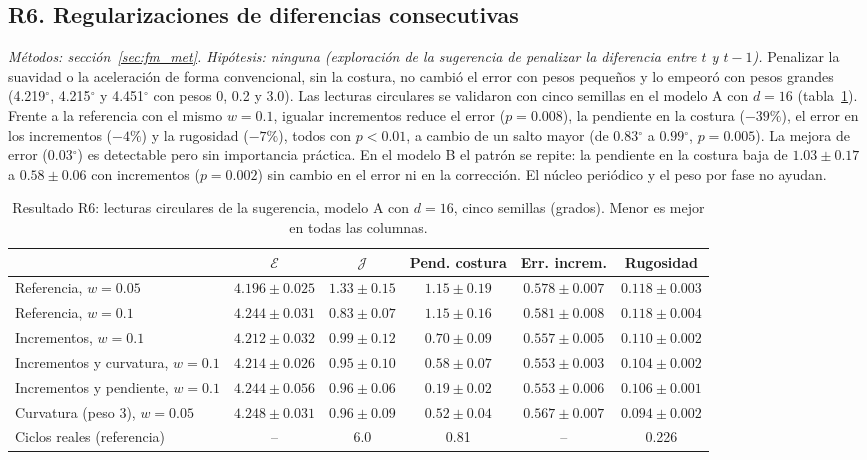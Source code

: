 \documentclass[11pt,a4paper]{article}
\newcommand{\gr}{$^{\circ}$}
\begin{document}
\subsection{R6. Regularizaciones de diferencias consecutivas}
\label{sec:r6}

\textit{Métodos: sección~\ref{sec:fm_met}. Hipótesis: ninguna (exploración de la sugerencia de penalizar la diferencia entre $t$ y $t-1$).} Penalizar la suavidad o la aceleración de forma convencional, sin la costura, no cambió el error con pesos pequeños y lo empeoró con pesos grandes (4.219\gr{}, 4.215\gr{} y 4.451\gr{} con pesos 0, 0.2 y 3.0). Las lecturas circulares se validaron con cinco semillas en el modelo A con $d=16$ (tabla~\ref{tab:lecturas}). Frente a la referencia con el mismo $w=0.1$, igualar incrementos reduce el error ($p=0.008$), la pendiente en la costura ($-39\%$), el error en los incrementos ($-4\%$) y la rugosidad ($-7\%$), todos con $p<0.01$, a cambio de un salto mayor (de $0.83$\gr{} a $0.99$\gr{}, $p=0.005$). La mejora de error ($0.03$\gr) es detectable pero sin importancia práctica. En el modelo B el patrón se repite: la pendiente en la costura baja de $1.03\pm0.17$ a $0.58\pm0.06$ con incrementos ($p=0.002$) sin cambio en el error ni en la corrección. El núcleo periódico y el peso por fase no ayudan.

\begin{table}[h]
\centering\footnotesize
\setlength{\tabcolsep}{3pt}
\begin{tabular}{lccccc}
\toprule
 & $\mathcal E$ & $\mathcal J$ & Pend. costura & Err. increm. & Rugosidad \\
\midrule
Referencia, $w=0.05$ & $4.196\pm0.025$ & $1.33\pm0.15$ & $1.15\pm0.19$ & $0.578\pm0.007$ & $0.118\pm0.003$ \\
Referencia, $w=0.1$ & $4.244\pm0.031$ & $0.83\pm0.07$ & $1.15\pm0.16$ & $0.581\pm0.008$ & $0.118\pm0.004$ \\
Incrementos, $w=0.1$ & $4.212\pm0.032$ & $0.99\pm0.12$ & $0.70\pm0.09$ & $0.557\pm0.005$ & $0.110\pm0.002$ \\
Incrementos y curvatura, $w=0.1$ & $4.214\pm0.026$ & $0.95\pm0.10$ & $0.58\pm0.07$ & $0.553\pm0.003$ & $0.104\pm0.002$ \\
Incrementos y pendiente, $w=0.1$ & $4.244\pm0.056$ & $0.96\pm0.06$ & $0.19\pm0.02$ & $0.553\pm0.006$ & $0.106\pm0.001$ \\
Curvatura (peso 3), $w=0.05$ & $4.248\pm0.031$ & $0.96\pm0.09$ & $0.52\pm0.04$ & $0.567\pm0.007$ & $0.094\pm0.002$ \\
\midrule
Ciclos reales (referencia) & -- & 6.0 & 0.81 & -- & 0.226 \\
\bottomrule
\end{tabular}
\caption{Resultado R6: lecturas circulares de la sugerencia, modelo A con $d=16$, cinco semillas (grados). Menor es mejor en todas las columnas.}
\label{tab:lecturas}
\end{table}
\end{document}
